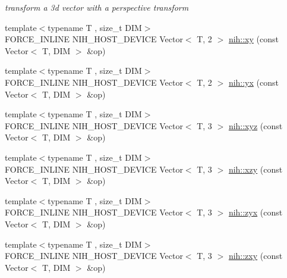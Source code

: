 \begin{DoxyCompactItemize}
\begin{DoxyCompactList}\small\item\em transform a 3d vector with a perspective transform \end{DoxyCompactList}\item 
{\footnotesize template$<$typename T , size\-\_\-t \-D\-I\-M$>$ }\\\-F\-O\-R\-C\-E\-\_\-\-I\-N\-L\-I\-N\-E \-N\-I\-H\-\_\-\-H\-O\-S\-T\-\_\-\-D\-E\-V\-I\-C\-E \*
\-Vector$<$ \-T, 2 $>$ \hyperlink{group__linalg_gab815e30e4a8c47b3ff177de0ba4162cb}{nih\-::xy} (const \-Vector$<$ \-T, \-D\-I\-M $>$ \&op)
\item 
{\footnotesize template$<$typename T , size\-\_\-t \-D\-I\-M$>$ }\\\-F\-O\-R\-C\-E\-\_\-\-I\-N\-L\-I\-N\-E \-N\-I\-H\-\_\-\-H\-O\-S\-T\-\_\-\-D\-E\-V\-I\-C\-E \*
\-Vector$<$ \-T, 2 $>$ \hyperlink{group__linalg_gaa33a532874bb7f0c3977391f83dc64a3}{nih\-::yx} (const \-Vector$<$ \-T, \-D\-I\-M $>$ \&op)
\item 
{\footnotesize template$<$typename T , size\-\_\-t \-D\-I\-M$>$ }\\\-F\-O\-R\-C\-E\-\_\-\-I\-N\-L\-I\-N\-E \-N\-I\-H\-\_\-\-H\-O\-S\-T\-\_\-\-D\-E\-V\-I\-C\-E \*
\-Vector$<$ \-T, 3 $>$ \hyperlink{group__linalg_ga283f58e199d448be6746baec9dec6ac1}{nih\-::xyz} (const \-Vector$<$ \-T, \-D\-I\-M $>$ \&op)
\item 
{\footnotesize template$<$typename T , size\-\_\-t \-D\-I\-M$>$ }\\\-F\-O\-R\-C\-E\-\_\-\-I\-N\-L\-I\-N\-E \-N\-I\-H\-\_\-\-H\-O\-S\-T\-\_\-\-D\-E\-V\-I\-C\-E \*
\-Vector$<$ \-T, 3 $>$ \hyperlink{group__linalg_ga789568ee5abe245a1789c972459d9208}{nih\-::xzy} (const \-Vector$<$ \-T, \-D\-I\-M $>$ \&op)
\item 
{\footnotesize template$<$typename T , size\-\_\-t \-D\-I\-M$>$ }\\\-F\-O\-R\-C\-E\-\_\-\-I\-N\-L\-I\-N\-E \-N\-I\-H\-\_\-\-H\-O\-S\-T\-\_\-\-D\-E\-V\-I\-C\-E \*
\-Vector$<$ \-T, 3 $>$ \hyperlink{group__linalg_ga8ba75af33f38985f639aa3f3abe0dce2}{nih\-::zyx} (const \-Vector$<$ \-T, \-D\-I\-M $>$ \&op)
\item 
{\footnotesize template$<$typename T , size\-\_\-t \-D\-I\-M$>$ }\\\-F\-O\-R\-C\-E\-\_\-\-I\-N\-L\-I\-N\-E \-N\-I\-H\-\_\-\-H\-O\-S\-T\-\_\-\-D\-E\-V\-I\-C\-E \*
\-Vector$<$ \-T, 3 $>$ \hyperlink{group__linalg_ga531fcf7af9a93262536231c3fb69cb4f}{nih\-::zxy} (const \-Vector$<$ \-T, \-D\-I\-M $>$ \&op)
\item 

\end{DoxyCompactItemize}
